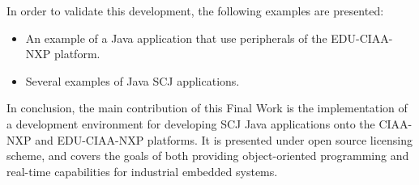 \noindent In order to validate this development, the following examples are presented:

\begin{itemize}
\item
An example of a Java application that use peripherals of the EDU-CIAA-NXP platform.
\item
Several examples of Java SCJ applications.
\end{itemize}

In conclusion, the main contribution of this Final Work is the implementation of a development environment for developing SCJ Java applications onto the CIAA-NXP and EDU-CIAA-NXP platforms. It is presented under open source licensing scheme, and covers the goals of both providing object-oriented programming and real-time capabilities for industrial embedded systems.

